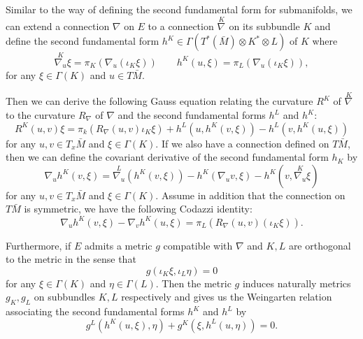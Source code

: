 Similar to the way of defining the second fundamental form for submanifolds, we can extend a connection $\nabla$  on $E$ to a connection $\overset{K}{\nabla_{}} $ on its subbundle $K$ and define the second fundamental form $h^K \in \Gamma (T^*(\bar{M}) \otimes K^* \otimes L)$ of $K$ where
\begin{equation*}
    \overset{K}{\nabla_{u}} \xi = \pi _K(\nabla_{u}^{} (\iota _K \xi )) \qquad 
    h^K(u,\xi )=\pi _L(\nabla_{u}^{} (\iota _K \xi )),
\end{equation*}
for any $\xi \in \Gamma (K)$ and $u \in T\bar{M}.$

Then we can derive the following Gauss equation relating the curvature $R^K$ of $\overset{K}{\nabla_{}} $ to the curvature $R_{\nabla }$ of $\nabla $ and the second fundamental forms $h^L$ and $h^K$:
\begin{equation*}
    R^K(u,v)\xi = \pi _k(R_{\nabla }(u,v)\iota _K \xi )+h^L(u,h^K(v,\xi ))-h^L(v,h^K(u,\xi ))
\end{equation*} 
for any $u,v \in T_x\bar{M}$ and $\xi \in \Gamma (K)$. If we also have a connection defined on $T\bar{M} $, then we can define the covariant derivative of the second fundamental form $h_K$ by 
\begin{equation*}
    \nabla_{u}^{} h^K(v,\xi) = \overset{L}{\nabla_{u}} (h^K(v,\xi ))-h^K(\nabla_{u}^{} v,\xi )-h^K(v, \overset{K}{\nabla_{u}} \xi )
\end{equation*}
for any $u,v \in T_x\bar{M}$ and $\xi \in \Gamma (K)$. Assume in addition that the connection on $T\bar{M} $ is symmetric, we have the following Codazzi identity:
\begin{equation} \label{Codazzi}
    \nabla_{u}^{} h^K(v, \xi )-  \nabla_{v}^{} h^K(u, \xi ) =\pi _L(R_{\nabla }(u,v)(\iota _K \xi )).
\end{equation}

Furthermore, if $E$ admits a metric $g$ compatible with $\nabla $ and $K,L$ are orthogonal to the metric in the sense that 
\begin{equation*}
    g(\iota _K \xi ,\iota _L \eta  )=0
\end{equation*}
for any $\xi \in \Gamma (K)$ and $\eta \in \Gamma (L)$. Then the metric $g$ induces naturally metrics $g_K, g_L$ on subbundles $K,L$ respectively and gives us the Weingarten relation associating the second fundamental forms $h^K$ and $h^L$ by 
\begin{equation*}
    g^L(h^K(u,\xi ), \eta )+g^K(\xi ,h^L(u,\eta ))=0.
\end{equation*}

